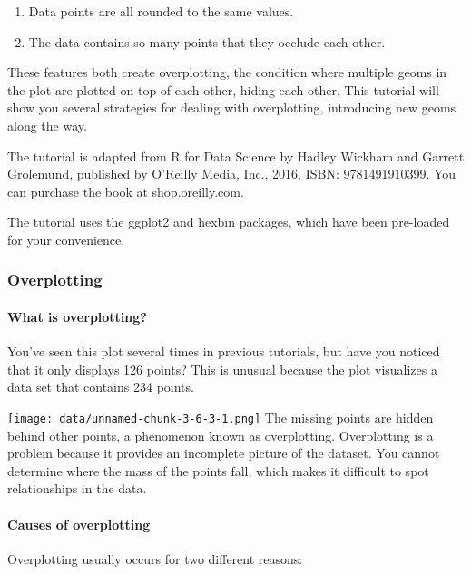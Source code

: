 \documentclass[
]{article}
\providecommand{\tightlist}{%
  \setlength{\itemsep}{0pt}\setlength{\parskip}{0pt}}
\begin{document}
\begin{enumerate}
\def\labelenumi{\arabic{enumi}.}
\tightlist
\item
  Data points are all rounded to the same values.
\item
  The data contains so many points that they occlude each other.
\end{enumerate}

These features both create overplotting, the condition where multiple
geoms in the plot are plotted on top of each other, hiding each other.
This tutorial will show you several strategies for dealing with
overplotting, introducing new geoms along the way.

The tutorial is adapted from R for Data Science by Hadley Wickham and
Garrett Grolemund, published by O'Reilly Media, Inc., 2016, ISBN:
9781491910399. You can purchase the book at shop.oreilly.com.

The tutorial uses the ggplot2 and hexbin packages, which have been
pre-loaded for your convenience.

\hypertarget{overplotting}{%
\subsubsection{Overplotting}\label{overplotting}}

\hypertarget{what-is-overplotting}{%
\paragraph{What is overplotting?}\label{what-is-overplotting}}

You've seen this plot several times in previous tutorials, but have you
noticed that it only displays 126 points? This is unusual because the
plot visualizes a data set that contains 234 points.

\texttt{[image: data/unnamed-chunk-3-6-3-1.png]} The missing points are
hidden behind other points, a phenomenon known as overplotting.
Overplotting is a problem because it provides an incomplete picture of
the dataset. You cannot determine where the mass of the points fall,
which makes it difficult to spot relationships in the data.

\hypertarget{causes-of-overplotting}{%
\paragraph{Causes of overplotting}\label{causes-of-overplotting}}

Overplotting usually occurs for two different reasons:
\end{document}
